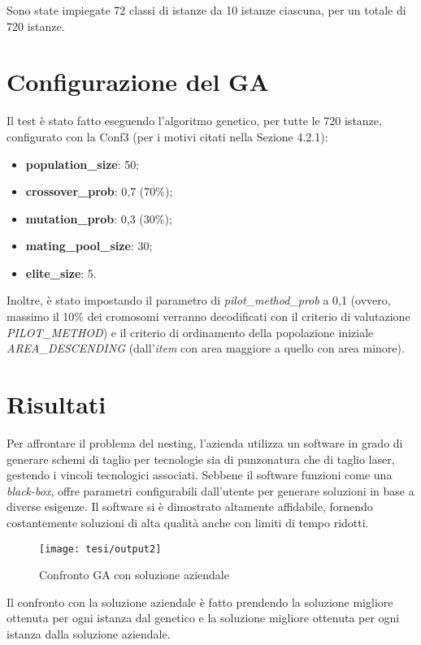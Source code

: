 Sono state impiegate 72 classi di istanze da 10 istanze ciascuna, per un totale di 720 istanze.

\section{Configurazione del GA}

Il test è stato fatto eseguendo l'algoritmo genetico, per tutte le 720 istanze, configurato con la Conf3 (per i motivi citati nella Sezione 4.2.1):
\begin{itemize}
    \item\textbf{population\_size}: 50;
	\item\textbf{crossover\_prob}: 0,7 (70\%);
	\item\textbf{mutation\_prob}: 0,3 (30\%);
	\item\textbf{mating\_pool\_size}: 30;
	\item\textbf{elite\_size}: 5.
\end{itemize}
Inoltre, è stato impostando il parametro di \emph{pilot\_method\_prob} a 0,1 (ovvero, massimo il 10\% dei cromosomi verranno decodificati con il criterio di valutazione \emph{PILOT\_METHOD}) e il criterio di ordinamento della popolazione iniziale \emph{AREA\_DESCENDING} (dall'\emph{item} con area maggiore a quello con area minore).

\section{Risultati}

Per affrontare il problema del nesting, l'azienda utilizza un software in grado di generare schemi di taglio per tecnologie sia di punzonatura che di taglio laser, gestendo i vincoli tecnologici associati. Sebbene il software funzioni come una \emph{black-box}\glsfirstoccur, offre parametri configurabili dall'utente per generare soluzioni in base a diverse esigenze. Il software si è dimostrato altamente affidabile, fornendo costantemente soluzioni di alta qualità anche con limiti di tempo ridotti.

\begin{figure}[!ht] 
    \centering 
    \texttt{[image: tesi/output2]} 
    \caption{Confronto GA con soluzione aziendale}
\end{figure}

Il confronto con la soluzione aziendale è fatto prendendo la soluzione migliore ottenuta per ogni istanza dal genetico e la soluzione migliore ottenuta per ogni istanza dalla soluzione aziendale.


